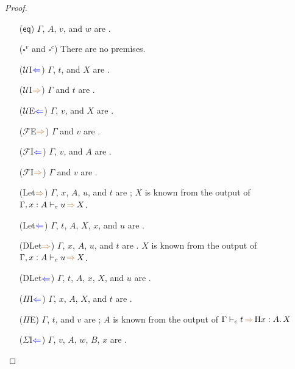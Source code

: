 \documentclass[a4,natbib=false]{article}
\newcommand{\ctov}{\mathcal{U}}
\newcommand{\vtoc}{\mathcal{F}}
\newcommand{\unival}{\square^{v}}
\newcommand{\unicomp}{\square^{c}}
\newcommand{\pitype}[2]{\Pi {#1}.\,#2}
\newcommand{\checks}{{\color{blue} \Leftarrow}}
\newcommand{\infers}{{\color{brown} \Rightarrow}}
\newcommand{\judgecInfer}[3]{{#1} \vdash_{c} {#2} \, \infers \, {#3}}
\begin{document}
\begin{proof}
\begin{multicols}{2}
\begin{itemize}
      \item[($\mathsf{eq}$)]
        $\Gamma$, $A$, $v$, and $w$ are \fromconcl.

      \item[($\unival$ and $\unicomp$)]
        There are no premises.

      \item[($\ctov$I$\checks$)]
        $\Gamma$, $t$, and $X$ are \fromconcl.

      \item[($\ctov$I$\infers$)]
        $\Gamma$ and $t$ are \fromconcl.

      \item[($\ctov$E$\checks$)]
        $\Gamma$, $v$, and $X$ are \fromconcl.

      \item[($\vtoc$E$\infers$)]
        $\Gamma$ and $v$ are \fromconcl.

      \item[($\vtoc$I$\checks$)]
        $\Gamma$, $v$, and $A$ are \fromconcl.

      \item[($\vtoc$I$\infers$)]
        $\Gamma$ and $v$ are \fromconcl.

      \item[(Let$\infers$)]
        $\Gamma$, $x$, $A$, $u$, and $t$ are \fromconcl;
        $X$ is known from the output of $\judgecInfer{\Gamma, x : A}{u}{X}$.
        
      \item[(Let$\checks$)]
        $\Gamma$, $t$, $A$, $X$, $x$, and $u$ are \fromconcl.

      \item[(DLet$\infers$)]
        $\Gamma$, $x$, $A$, $u$, and $t$ are \fromconcl.
        $X$ is known from the output of $\judgecInfer{\Gamma, x:A}{u}{X}$.

      \item[(DLet$\checks$)]
        $\Gamma$, $t$, $A$, $x$, $X$, and $u$ are \fromconcl.

      \item[($\Pi$I$\checks$)]
        $\Gamma$, $x$, $A$, $X$, and $t$ are \fromconcl.

      \item[($\Pi$E)]
        $\Gamma$, $t$, and $v$ are \fromconcl;
        $A$ is known from the output of $\judgecInfer{\Gamma}{t}{\pitype{x:A}{X}}$

      \item[($\Sigma$I$\checks$)]
        $\Gamma$, $v$, $A$, $w$, $B$, $x$ are \fromconcl.


\end{itemize}
\end{multicols}
\end{proof}
\end{document}
